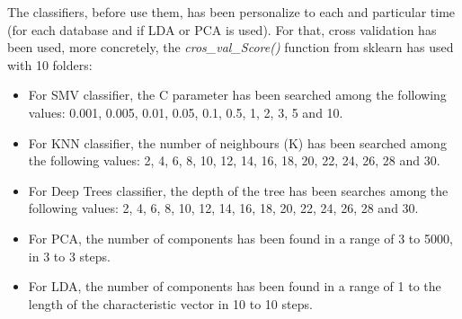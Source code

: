 The classifiers, before use them, has been personalize to each and particular time (for each database and if LDA or PCA is used). For that, cross validation has been used, more concretely, the \textit{cros\_val\_Score()} function from sklearn has used with 10 folders:
\begin{itemize}
\item For SMV classifier, the C parameter has been searched among the following values: 0.001, 0.005, 0.01, 0.05, 0.1, 0.5, 1, 2, 3, 5 and 10.
\item For KNN classifier, the number of neighbours (K) has been searched among the following values: 2, 4, 6, 8, 10, 12, 14, 16, 18, 20, 22, 24, 26, 28 and 30.
\item For Deep Trees classifier, the depth of the tree has been searches among the following values: 2, 4, 6, 8, 10, 12, 14, 16, 18, 20, 22, 24, 26, 28 and 30.
\item For PCA, the number of components has been found in a range of 3 to 5000, in 3 to 3 steps.
\item For LDA, the number of components has been found in a range of 1 to the length of the characteristic vector in 10 to 10 steps.
\end{itemize}

\clearpage
